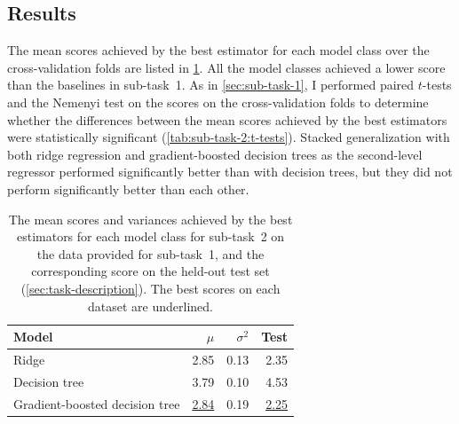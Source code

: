 \subsection{Results}
\label{sec:sub-task-2:results}

The mean scores achieved by the best estimator for each model class over the
cross-validation folds are listed in \cref{tab:sub-task-2:results}.
All the model classes achieved a lower score than the baselines in sub-task~1.
As in \cref{sec:sub-task-1}, I performed paired $t$-tests and the Nemenyi test on the
scores on the cross-validation folds to determine whether the differences between the
mean scores achieved by the best estimators were statistically significant
(\cref{tab:sub-task-2:t-tests}).
Stacked generalization with both ridge regression and gradient-boosted decision trees
as the second-level regressor performed significantly better than with decision trees,
but they did not perform significantly better than each other.

\begin{table}
  \centering
  \begin{tabular}{lrrr}
    \toprule
    Model                          & $\mu$            & $\sigma^2$ & Test
    \\
    \midrule
    Ridge                          & 2.85             & 0.13       & 2.35
    \\
    Decision tree                  & 3.79             & 0.10       & 4.53
    \\
    Gradient-boosted decision tree & \underline{2.84} & 0.19       & \underline{2.25}
    \\
    \bottomrule
  \end{tabular}
  \caption{The mean scores and variances achieved by the best estimators for each model
    class for sub-task~2 on the data provided for sub-task~1, and the corresponding score
    on the held-out test set (\cref{sec:task-description}).
    The best scores on each dataset are underlined.
  }
  \label{tab:sub-task-2:results}
\end{table}

\begin{table}
  \centering
  
  \caption{The $t$-statistics from paired $t$-tests, and $p$-values from the Nemenyi test, on the
    mean scores of the best estimators for sub-task~2.
    As in \cref{tab:sub-task-1:t-tests}, a positive $t$-statistic indicates that `Model B'
    achieved a lower mean score than `Model A'.
  }
  \label{tab:sub-task-2:t-tests}
\end{table}

